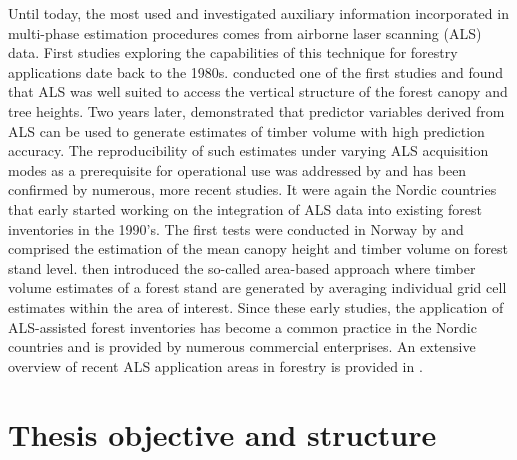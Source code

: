 Until today, the most used and investigated auxiliary information incorporated in multi-phase estimation procedures comes from airborne laser scanning (ALS) data. First studies exploring the capabilities of this technique for forestry applications date back to the 1980s. \citet{nelson1984} conducted one of the first studies and found that ALS was well suited to access the vertical structure of the forest canopy and tree heights. Two years later, \citet{maclean1986} demonstrated that predictor variables derived from ALS can be used to generate estimates of timber volume with high prediction accuracy. The reproducibility of such estimates under varying ALS acquisition modes as a prerequisite for operational use was addressed by \citet{nelson1988} and has been confirmed by numerous, more recent studies. It were again the Nordic countries that early started working on the integration of ALS data into existing forest inventories in the 1990's. The first tests were conducted in Norway by \citet{naesset1997a, naesset1997b} and comprised the estimation of the mean canopy height and timber volume on forest stand level. \citet{naesset2002} then introduced the so-called area-based approach where timber volume estimates of a forest stand are generated by averaging individual grid cell estimates within the area of interest. Since these early studies, the application of ALS-assisted forest inventories has become a common practice in the Nordic countries and is provided by numerous commercial enterprises. An extensive overview of recent ALS application areas in forestry is provided in \citet{maltamo2014}. 





















\newpage
\section{Thesis objective and structure}
\label{sec:intro:obj_and_struct}



